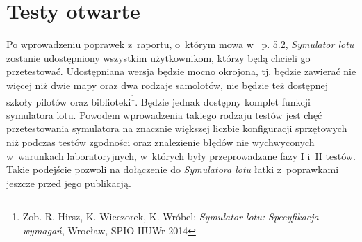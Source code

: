 \documentclass{mwrep}
\begin{document}
\section{Testy otwarte}
Po wprowadzeniu poprawek z~raportu, o~którym mowa w~ p. 5.2, \textit{Symulator lotu} zostanie udostępniony wszystkim użytkownikom, którzy będą chcieli go przetestować. Udostępniana wersja będzie mocno okrojona, tj. będzie zawierać nie więcej niż dwie mapy oraz dwa rodzaje samolotów, nie będzie też dostępnej szkoły pilotów oraz biblioteki\footnote{Zob. R. Hirsz, K. Wieczorek, K. Wróbel: \textit{Symulator lotu: Specyfikacja wymagań}, Wrocław, SPIO IIUWr 2014}. Będzie jednak dostępny komplet funkcji symulatora lotu. Powodem wprowadzenia takiego rodzaju testów jest chęć przetestowania symulatora na znacznie większej liczbie konfiguracji sprzętowych niż podczas testów zgodności oraz znalezienie błędów  nie wychwyconych w~warunkach laboratoryjnych, w~których były przeprowadzane fazy I i~II testów. Takie podejście pozwoli na dołączenie do \textit{Symulatora lotu} łatki z~poprawkami jeszcze przed jego publikacją.
\end{document}
